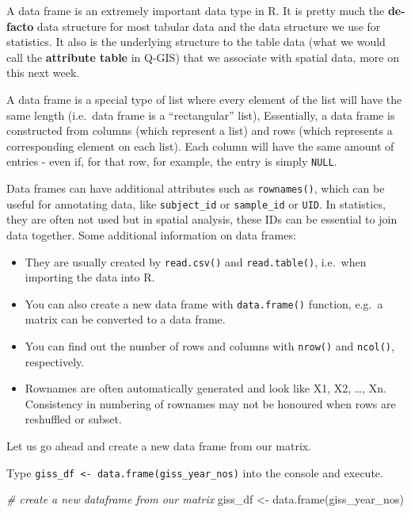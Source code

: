 \documentclass[
]{book}
\newenvironment{Shaded}{\begin{snugshade}}{\end{snugshade}}
\newcommand{\CommentTok}[1]{\textcolor[rgb]{0.56,0.35,0.01}{\textit{#1}}}
\newcommand{\FunctionTok}[1]{\textcolor[rgb]{0.00,0.00,0.00}{#1}}
\newcommand{\NormalTok}[1]{#1}
\newcommand{\OtherTok}[1]{\textcolor[rgb]{0.56,0.35,0.01}{#1}}
\providecommand{\tightlist}{%
  \setlength{\itemsep}{0pt}\setlength{\parskip}{0pt}}
\begin{document}
A data frame is an extremely important data type in R. It is pretty much the \textbf{de-facto} data structure for most tabular data and the data structure we use for statistics. It also is the underlying structure to the table data (what we would call the \textbf{attribute table} in Q-GIS) that we associate with spatial data, more on this next week.

A data frame is a special type of list where every element of the list will have the same length (i.e.~data frame is a ``rectangular'' list), Essentially, a data frame is constructed from columns (which represent a list) and rows (which represents a corresponding element on each list). Each column will have the same amount of entries - even if, for that row, for example, the entry is simply \texttt{NULL}.

Data frames can have additional attributes such as \texttt{rownames()}, which can be useful for annotating data, like \texttt{subject\_id} or \texttt{sample\_id} or \texttt{UID}. In statistics, they are often not used but in spatial analysis, these IDs can be essential to join data together. Some additional information on data frames:

\begin{itemize}
\tightlist
\item
  They are usually created by \texttt{read.csv()} and \texttt{read.table()}, i.e.~when importing the data into R.
\item
  You can also create a new data frame with \texttt{data.frame()} function, e.g.~a matrix can be converted to a data frame.
\item
  You can find out the number of rows and columns with \texttt{nrow()} and \texttt{ncol()}, respectively.
\item
  Rownames are often automatically generated and look like X1, X2, \ldots, Xn. Consistency in numbering of rownames may not be honoured when rows are reshuffled or subset.
\end{itemize}

Let us go ahead and create a new data frame from our matrix.

Type \texttt{giss\_df\ \textless{}-\ data.frame(giss\_year\_nos)} into the console and execute.

\begin{Shaded}
\begin{Highlighting}[]
\CommentTok{\# create a new dataframe from our matrix}
\NormalTok{giss\_df }\OtherTok{\textless{}{-}} \FunctionTok{data.frame}\NormalTok{(giss\_year\_nos)}
\end{Highlighting}
\end{Shaded}
\end{document}
